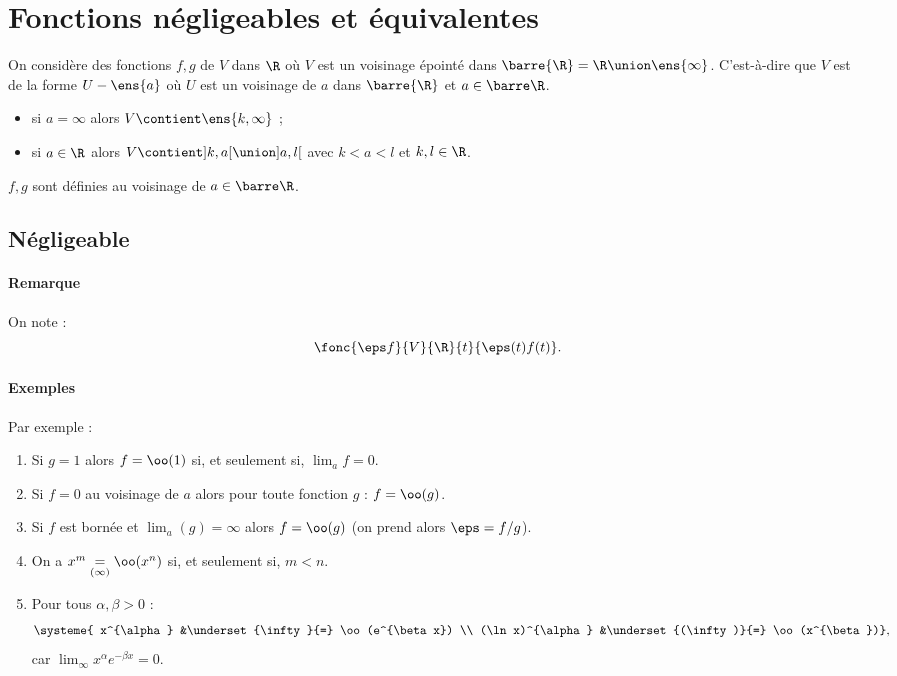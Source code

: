 \section{Fonctions négligeables et équivalentes}

On considère des fonctions $f,g$ de $V$ dans $\R$ où $V$ est un voisinage épointé dans $\barre{\R} = \R \union \ens{\infty}$. C'est-à-dire que $V$ est de la forme $U - \ens{a}$ où $U$ est un voisinage de $a$ dans $\barre{\R}$ et $a\in \iR$.
\begin{itemize}
\item si $a = \infty$ alors $V \contient \ens{k,\infty}$ ;
\item si $a\in \R$ alors $V \contient ]k,a[ \union ]a,l[$ avec $k < a < l$ et $k,l\in \R$.
\end{itemize}

$f,g$ sont définies au voisinage de $a\in \iR$.

\subsection{Négligeable}

\paragraph{Remarque}On note :\[\fonc{\eps f}{V}{\R}{t}{\eps(t)f(t)}. \]
\paragraph{Exemples}Par exemple :
\begin{enumerate}
\item Si $g=1$ alors $f = \oo(1)$ si, et seulement si, $\lim_a f =0$.
\item Si $f=0$ au voisinage de $a$ alors pour toute fonction $g$ : $f = \oo(g)$.
\item Si $f$ est bornée et $\lim_a(g) = \infty$ alors $f = \oo(g)$ (on prend alors $\eps = f/g$).
\item On a $x^m \underset{(\infty)}{=}\oo(x^n)$ si, et seulement si, $m < n$.
\item Pour tous $\alpha,\beta >0$ : \[\systeme{ x^{\alpha} &\underset{\infty}{=} \oo(e^{\beta x}) \\ (\ln x)^{\alpha} &\underset{(\infty)}{=} \oo(x^{\beta})},\]car $\lim_\infty x^{\alpha}e^{-\beta x} = 0$.
\end{enumerate}

